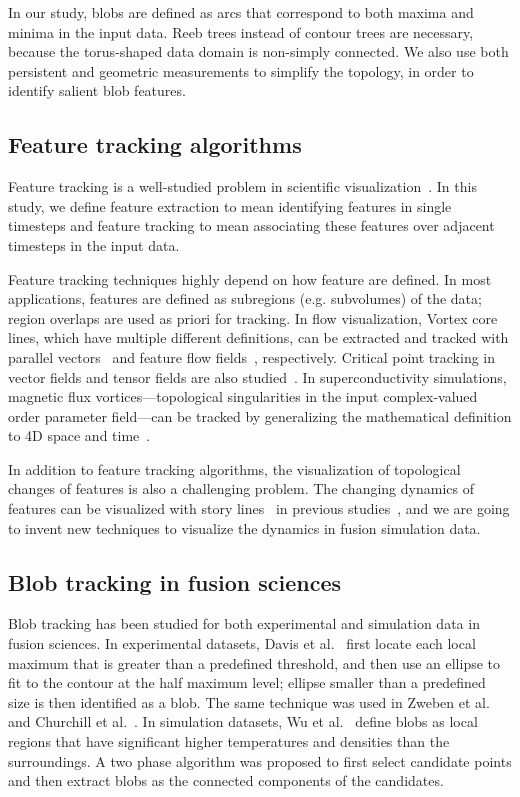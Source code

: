 In our study, blobs are defined as arcs that correspond to both maxima and minima in the input data.  Reeb trees instead of contour trees are necessary, because the torus-shaped data domain is non-simply connected.  We also use both persistent and geometric measurements to simplify the topology, in order to identify salient blob features.  


\subsection{Feature tracking algorithms}

Feature tracking is a well-studied problem in scientific visualization~\cite{PostVHLD2003}.  In this study, we define feature extraction to mean identifying features in single timesteps and feature tracking to mean associating these features over adjacent timesteps in the input data.  

Feature tracking techniques highly depend on how feature are defined.  In most applications, features are defined as subregions (e.g. subvolumes) of the data; region overlaps are used as priori for tracking.  In flow visualization, Vortex core lines, which have multiple different definitions, can be extracted and tracked with parallel vectors~\cite{PeikertR99} and feature flow fields~\cite{TheiselS03, WeinkaufTGP11}, respectively.  Critical point tracking in vector fields and tensor fields are also studied~\cite{GarthTS04, TricocheSH01, TricocheWSH02, ReininghausKWH12}.  In superconductivity simulations, magnetic flux vortices---topological singularities in the input complex-valued order parameter field---can be tracked by generalizing the mathematical definition to 4D space and time~\cite{GuoPPKG16, GuoPG17, PhillipsGPKG16, PhillipsPKG15}.  

In addition to feature tracking algorithms, the visualization of topological changes of features is also a challenging problem.  The changing dynamics of features can be visualized with story lines~\cite{TanahashiM12} in previous studies~\cite{GuoPPKG16}, and we are going to invent new techniques to visualize the dynamics in fusion simulation data.  


\subsection{Blob tracking in fusion sciences}

Blob tracking has been studied for both experimental and simulation data in fusion sciences.  In experimental datasets, Davis et al.~\cite{DavisKMRSZ14} first locate each local maximum that is greater than a predefined threshold, and then use an ellipse to fit to the contour at the half maximum level; ellipse smaller than a predefined size is then identified as a blob.  The same technique was used in Zweben et al.~\cite{Zweben15} and Churchill et al.~\cite{Churchill17}.  In simulation datasets, Wu et al.~\cite{WuWSCCSCK16} define blobs as local regions that have significant higher temperatures and densities than the surroundings.  A two phase algorithm was proposed to first select candidate points and then extract blobs as the connected components of the candidates.  

